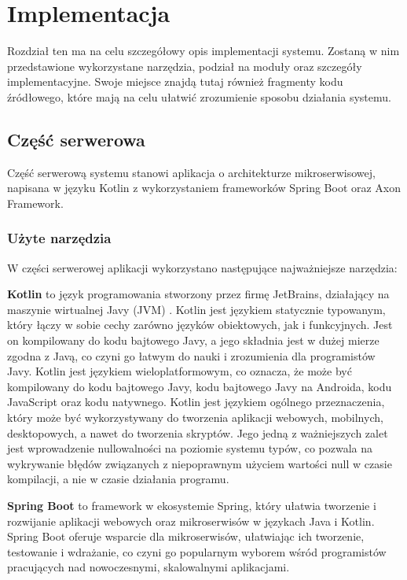 \clearpage %

\section{Implementacja}

Rozdział ten ma na celu szczegółowy opis implementacji systemu. Zostaną w nim przedstawione wykorzystane narzędzia, podział na moduły oraz szczegóły implementacyjne. Swoje miejsce znajdą tutaj również fragmenty kodu źródłowego, które mają na celu ułatwić zrozumienie sposobu działania systemu.

\subsection{Część serwerowa}

Część serwerową systemu stanowi aplikacja o architekturze mikroserwisowej, napisana w języku Kotlin z wykorzystaniem frameworków Spring Boot oraz Axon Framework.

\subsubsection{Użyte narzędzia}

W części serwerowej aplikacji wykorzystano następujące najważniejsze narzędzia:

\textbf{Kotlin} \cite{kotlin} to język programowania stworzony przez firmę JetBrains, działający na maszynie wirtualnej Javy (JVM) \cite{jvm}. Kotlin jest językiem statycznie typowanym, który łączy w sobie cechy zarówno języków obiektowych, jak i funkcyjnych. Jest on kompilowany do kodu bajtowego Javy, a jego składnia jest w dużej mierze zgodna z Javą, co czyni go łatwym do nauki i zrozumienia dla programistów Javy. Kotlin jest językiem wieloplatformowym, co oznacza, że może być kompilowany do kodu bajtowego Javy, kodu bajtowego Javy na Androida, kodu JavaScript oraz kodu natywnego. Kotlin jest językiem ogólnego przeznaczenia, który może być wykorzystywany do tworzenia aplikacji webowych, mobilnych, desktopowych, a nawet do tworzenia skryptów. Jego jedną z ważniejszych zalet jest wprowadzenie nullowalności na poziomie systemu typów, co pozwala na wykrywanie błędów związanych z niepoprawnym użyciem wartości null w czasie kompilacji, a nie w czasie działania programu.

\textbf{Spring Boot} \cite{springboot} to framework w ekosystemie Spring, który ułatwia tworzenie i rozwijanie aplikacji webowych oraz mikroserwisów w językach Java i Kotlin. Spring Boot oferuje wsparcie dla mikroserwisów, ułatwiając ich tworzenie, testowanie i wdrażanie, co czyni go popularnym wyborem wśród programistów pracujących nad nowoczesnymi, skalowalnymi aplikacjami.

